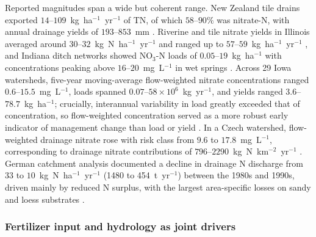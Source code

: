 Reported magnitudes span a wide but coherent range. New Zealand tile
drains exported $14$--$109$~kg~ha$^{-1}$~yr$^{-1}$ of TN, of which
$58$--$90\%$ was nitrate-N, with annual drainage yields of $193$--$853$~mm
\parencite{Tanner2011}. Riverine and tile nitrate yields in Illinois
averaged around $30$--$32$~kg~N~ha$^{-1}$~yr$^{-1}$ and ranged up to
$57$--$59$~kg~ha$^{-1}$~yr$^{-1}$ \parencite{Gentry2014}, and Indiana ditch
networks showed NO$_3$-N loads of $0.05$--$19$~kg~ha$^{-1}$ with
concentrations peaking above $16$--$20$~mg~L$^{-1}$ in wet springs
\parencite{Smith2008}. Across 29 Iowa watersheds, five-year moving-average
flow-weighted nitrate concentrations ranged $0.6$--$15.5$~mg~L$^{-1}$,
loads spanned $0.07$--$58\times10^{6}$~kg~yr$^{-1}$, and yields ranged
$3.6$--$78.7$~kg~ha$^{-1}$; crucially, interannual variability in load
greatly exceeded that of concentration, so flow-weighted concentration
served as a more robust early indicator of management change than load or
yield \parencite{Danalatos2022}. In a Czech watershed, flow-weighted
drainage nitrate rose with risk class from $9.6$ to $17.8$~mg~L$^{-1}$,
corresponding to drainage nitrate contributions of $796$--$2290$~kg~N~km$^{-2}$~yr$^{-1}$
\parencite{Kvítek2023}. German catchment analysis documented a decline in
drainage N discharge from $33$ to $10$~kg~N~ha$^{-1}$~yr$^{-1}$ (1480 to
454~t~yr$^{-1}$) between the 1980s and 1990s, driven mainly by reduced N
surplus, with the largest area-specific losses on sandy and loess
substrates \parencite{Hirt2005b}.

\subsubsection{Fertilizer input and hydrology as joint drivers}

